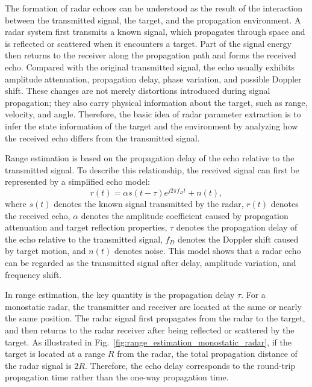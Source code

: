 
The formation of radar echoes can be understood as the result of the
interaction between the transmitted signal, the target, and the propagation
environment.
A radar system first transmits a known signal, which propagates through space
and is reflected or scattered when it encounters a target.
Part of the signal energy then returns to the receiver along the propagation
path and forms the received echo.
Compared with the original transmitted signal, the echo usually exhibits
amplitude attenuation, propagation delay, phase variation, and possible
Doppler shift.
These changes are not merely distortions introduced during signal propagation;
they also carry physical information about the target, such as range,
velocity, and angle.
Therefore, the basic idea of radar parameter extraction is to infer the state
information of the target and the environment by analyzing how the received
echo differs from the transmitted signal.

Range estimation is based on the propagation delay of the echo relative to
the transmitted signal.
To describe this relationship, the received signal can first be represented
by a simplified echo model:
\begin{equation}
    r(t)=\alpha s(t-\tau)e^{j2\pi f_D t}+n(t),
    \label{eq:simplified_radar_echo_model}
\end{equation}
where \(s(t)\) denotes the known signal transmitted by the radar,
\(r(t)\) denotes the received echo, \(\alpha\) denotes the amplitude
coefficient caused by propagation attenuation and target reflection properties,
\(\tau\) denotes the propagation delay of the echo relative to the transmitted
signal, \(f_D\) denotes the Doppler shift caused by target motion, and \(n(t)\)
denotes noise.
This model shows that a radar echo can be regarded as the transmitted signal
after delay, amplitude variation, and frequency shift.

In range estimation, the key quantity is the propagation delay \(\tau\).
For a monostatic radar, the transmitter and receiver are located at the same
or nearly the same position.
The radar signal first propagates from the radar to the target, and then
returns to the radar receiver after being reflected or scattered by the target.
As illustrated in Fig.~\ref{fig:range_estimation_monostatic_radar}, if the
target is located at a range \(R\) from the radar, the total propagation
distance of the radar signal is \(2R\).
Therefore, the echo delay corresponds to the round-trip propagation time
rather than the one-way propagation time.

